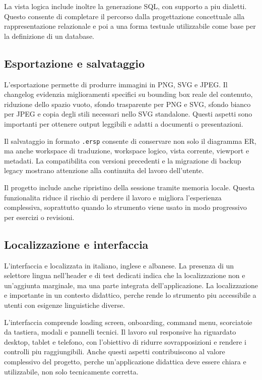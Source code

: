 La vista logica include inoltre la generazione SQL, con supporto a piu dialetti. Questo consente di completare il percorso dalla progettazione concettuale alla rappresentazione relazionale e poi a una forma testuale utilizzabile come base per la definizione di un database.

\subsection{Esportazione e salvataggio}

L'esportazione permette di produrre immagini in PNG, SVG e JPEG. Il changelog evidenzia miglioramenti specifici su bounding box reale del contenuto, riduzione dello spazio vuoto, sfondo trasparente per PNG e SVG, sfondo bianco per JPEG e copia degli stili necessari nello SVG standalone. Questi aspetti sono importanti per ottenere output leggibili e adatti a documenti o presentazioni.

Il salvataggio in formato \texttt{.ersp} consente di conservare non solo il diagramma ER, ma anche workspace di traduzione, workspace logico, vista corrente, viewport e metadati. La compatibilita con versioni precedenti e la migrazione di backup legacy mostrano attenzione alla continuita del lavoro dell'utente.

Il progetto include anche ripristino della sessione tramite memoria locale. Questa funzionalita riduce il rischio di perdere il lavoro e migliora l'esperienza complessiva, soprattutto quando lo strumento viene usato in modo progressivo per esercizi o revisioni.

\subsection{Localizzazione e interfaccia}

L'interfaccia e localizzata in italiano, inglese e albanese. La presenza di un selettore lingua nell'header e di test dedicati indica che la localizzazione non e un'aggiunta marginale, ma una parte integrata dell'applicazione. La localizzazione e importante in un contesto didattico, perche rende lo strumento piu accessibile a utenti con esigenze linguistiche diverse.

L'interfaccia comprende loading screen, onboarding, command menu, scorciatoie da tastiera, modali e pannelli tecnici. Il lavoro sul responsive ha riguardato desktop, tablet e telefono, con l'obiettivo di ridurre sovrapposizioni e rendere i controlli piu raggiungibili. Anche questi aspetti contribuiscono al valore complessivo del progetto, perche un'applicazione didattica deve essere chiara e utilizzabile, non solo tecnicamente corretta.

